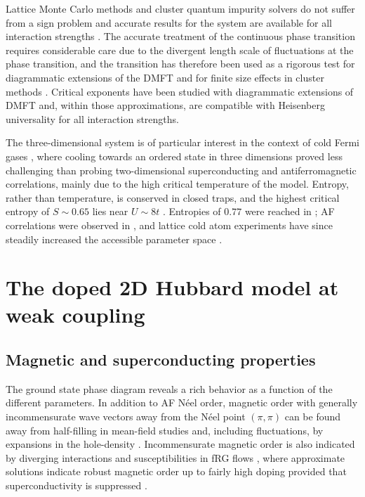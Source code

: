 \documentclass{ar-1col}
\begin{document}
Lattice Monte Carlo methods \cite{Blankenbecler81} and cluster quantum impurity solvers \cite{Gull11} do not suffer from a sign problem and accurate results for the system are available for all interaction strengths \cite{Kent05,Paiva11,Kozik13}. The accurate treatment of the continuous phase transition requires considerable care due to the divergent length scale of fluctuations at the phase transition, and the transition has therefore been used as a rigorous test for diagrammatic extensions of the DMFT \cite{Rohringer11,Hirschmeier15,Rohringer18} and for finite size effects in cluster methods \cite{Kent05,Fuchs11,Kozik13}.
Critical exponents have been studied with diagrammatic extensions of DMFT \cite{Rohringer11,Hirschmeier15,Schaefer17} and, within those approximations, are compatible with Heisenberg universality for all interaction strengths.

The three-dimensional system is of particular interest in the context of cold Fermi gases  \cite{Jaksch05,Esslinger10}, where cooling towards an ordered state in three dimensions proved less challenging than probing two-dimensional superconducting and antiferromagnetic correlations, mainly due to the high critical temperature of the model. Entropy, rather than temperature, is conserved in closed traps, and the highest critical entropy of $S\sim0.65$ lies near $U\sim 8t$  \cite{Fuchs11}. Entropies of $0.77$ were reached in \cite{Jordens10}; AF correlations were observed in \cite{Greif13,Hart15}, and lattice cold atom experiments have since steadily increased the accessible parameter space \cite{Ibarra20}. 

\section{The doped 2D Hubbard model at weak coupling}
\label{sec:weak}
\subsection{Magnetic and superconducting properties}
\label{sec:weak_magn}
The ground state phase diagram reveals a rich behavior as a function of the different parameters.
In addition to AF N\'{e}el order, magnetic order with generally incommensurate wave vectors away from the N\'eel point $(\pi,\pi)$ can be found away from half-filling in mean-field studies \cite{Schulz90,Dombre90,Fresard91,Igoshev10} and, including fluctuations, by expansions in the hole-density \cite{Shraiman89,Chubukov92,Chubukov95,Kotov04}.
Incommensurate magnetic order is also indicated by diverging interactions and susceptibilities %
in fRG flows \cite{Halboth00B,Husemann09,Metzner12}, where approximate solutions indicate robust magnetic order up to fairly high doping provided that superconductivity is suppressed \cite{Yamase16}.
\begin{marginnote}
\end{marginnote}
\end{document}
